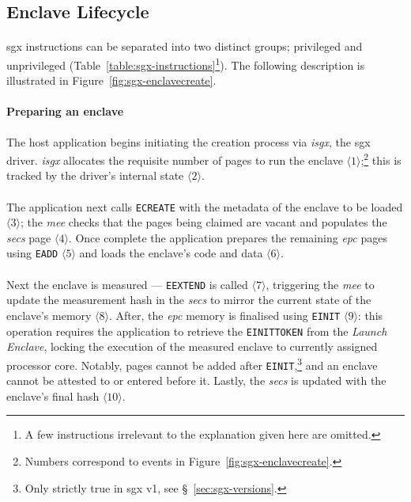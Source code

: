 \subsection{Enclave Lifecycle}
\label{sec:sgx-lifecycle}

\paragraph{} \acrshort{sgx}
instructions can be separated into two distinct groups; privileged and unprivileged (Table~\ref{table:sgx-instructions}\footnote{A few instructions irrelevant to the explanation given here are omitted.}). The following description is illustrated in Figure~\ref{fig:sgx-enclavecreate}.

\paragraph{Preparing an enclave} The host application begins initiating the creation process via \textit{isgx}, the \acrshort{sgx} driver. \textit{isgx} allocates the requisite number of pages to run the enclave $\langle 1 \rangle$;\footnote{Numbers correspond to events in Figure~\ref{fig:sgx-enclavecreate}.} this is tracked by the driver's internal state $\langle 2 \rangle$.

\paragraph{} The application next calls \texttt{ECREATE} with the metadata of the enclave to be loaded $\langle 3 \rangle$; the \textit{\acrshort{mee}} checks that the pages being claimed are vacant and populates the \textit{\acrshort{secs}} page $\langle 4 \rangle$. Once complete the application prepares the remaining \textit{\acrshort{epc}} pages using \texttt{EADD} $\langle 5 \rangle$ and loads the enclave's code and data $\langle 6 \rangle$.

\paragraph{} Next the enclave is measured --- \texttt{EEXTEND} is called $\langle 7 \rangle$, triggering the \textit{\acrshort{mee}} to update the measurement hash in the \textit{\acrshort{secs}} to mirror the current state of the enclave's memory $\langle 8 \rangle$. After, the \textit{\acrshort{epc}} memory is finalised using \texttt{EINIT} $\langle 9 \rangle$: this operation requires the application to retrieve the \texttt{EINITTOKEN} from the \textit{Launch Enclave}, locking the execution of the measured enclave to currently assigned processor core. Notably, pages cannot be added after \texttt{EINIT},\footnote{Only strictly true in \acrshort{sgx} v1, see §~\ref{sec:sgx-versions}.} and an enclave cannot be attested to or entered before it. Lastly, the \textit{\acrshort{secs}} is updated with the enclave's final hash $\langle 10 \rangle$.


